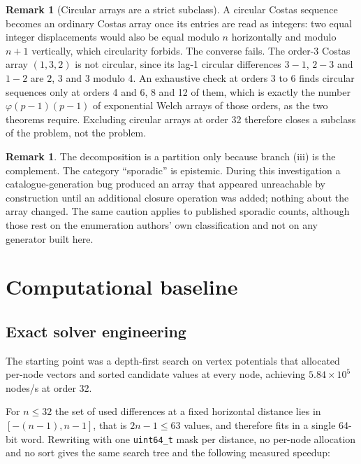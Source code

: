 \documentclass[11pt,a4paper,oneside]{report}
\theoremstyle{definition}
\newtheorem{remark}[theorem]{Remark}
\begin{document}
\begin{remark}[Circular arrays are a strict subclass]
\label{p1-rem:circular}
A circular Costas sequence becomes an ordinary Costas array once its entries are read as integers:
two equal integer displacements would also be equal modulo $n$ horizontally and modulo $n+1$
vertically, which circularity forbids. The converse fails. The order-3 Costas array $(1,3,2)$ is
not circular, since its lag-1 circular differences $3-1$, $2-3$ and $1-2$ are $2$, $3$ and $3$
modulo 4. An exhaustive check at orders 3 to 6 finds circular sequences only at orders 4 and 6, 8
and 12 of them, which is exactly the number $\varphi(p-1)(p-1)$ of exponential Welch arrays of
those orders, as the two theorems require. Excluding circular arrays at order 32 therefore closes a
subclass of the problem, not the problem.
\end{remark}

\begin{remark}
The decomposition is a partition only because branch (iii) is the complement.
The category ``sporadic'' is epistemic. During this investigation a
catalogue-generation bug produced an array that appeared unreachable by
construction until an additional closure operation was added; nothing about the
array changed. The same caution applies to published sporadic counts, although
those rest on the enumeration authors' own classification and not on any
generator built here.
\end{remark}

\section{Computational baseline}
\label{p1-sec:baseline}

\subsection{Exact solver engineering}

The starting point was a depth-first search on vertex potentials that allocated
per-node vectors and sorted candidate values at every node, achieving
$5.84\times 10^5$ nodes/s at order 32.

For $n\le 32$ the set of used differences at a fixed horizontal distance lies in
$[-(n-1),n-1]$, that is $2n-1 \le 63$ values, and therefore fits in a single
64-bit word. Rewriting with one \texttt{uint64\_t} mask per distance, no
per-node allocation and no sort gives the same search tree and the following
measured speedup:
\end{document}
